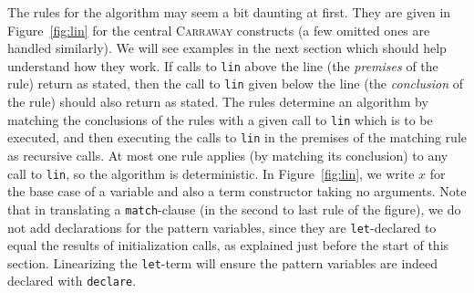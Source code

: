 \documentclass{book}[12pt]
\newcommand{\carraway}[0]{\textsc{Carraway}\xspace}
\begin{document}
The rules for the algorithm may seem a bit daunting at first.  They
are given in Figure~\ref{fig:lin} for the central \carraway constructs
(a few omitted ones are handled similarly).  We will see examples in
the next section which should help understand how they work.  If calls
to \texttt{lin} above the line (the \emph{premises} of the rule)
return as stated, then the call to \texttt{lin} given below the line
(the \emph{conclusion} of the rule) should also return as stated.  The
rules determine an algorithm by matching the conclusions of the rules
with a given call to \texttt{lin} which is to be executed, and then
executing the calls to \texttt{lin} in the premises of the matching
rule as recursive calls.  At most one rule applies (by matching its
conclusion) to any call to \texttt{lin}, so the algorithm is
deterministic.  In Figure~\ref{fig:lin}, we write $x$ for the base
case of a variable and also a term constructor taking no arguments.
Note that in translating a \texttt{match}-clause (in the second to
last rule of the figure), we do not add declarations for the pattern
variables, since they are \texttt{let}-declared to equal the results
of initialization calls, as explained just before the start of this
section.  Linearizing the \texttt{let}-term will ensure the pattern
variables are indeed declared with \texttt{declare}.
\end{document}
